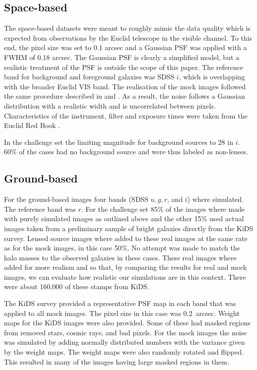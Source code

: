 \documentclass[useAMS,usenatbib]{mnras}
\begin{document}
\subsection{Space-based}
\label{sec:sim-space-based}

The space-based datasets were meant to roughly mimic the data quality which is expected from observations by the Euclid telescope in the visible channel. To this end, the pixel size was set to 0.1 arcsec and a Gaussian PSF was applied with a FWHM of 0.18 arcsec. The Gaussian PSF is clearly a simplified model, but a realistic treatment of the PSF is outside the scope of this paper. The reference band for background and foreground galaxies was SDSS $i$, which is overlapping with the broader Euclid VIS band. The realisation of the mock images followed the same procedure described in \citet{2004PASP..116..750G} and \citet{2008A&A...482..403M}. As a result, the noise follows a Gaussian distribution with a realistic width and is uncorrelated between pixels. Characteristics of the instrument, filter and exposure times were taken from the Euclid Red Book \citep{2011arXiv1110.3193L}.
 
 In the challenge set the limiting magnitude for background sources to 28 in $i$.   60\% of the cases had no background source and were thus labeled as non-lenses.
 
\subsection{Ground-based}
\label{sec:sim-ground-based}

For the ground-based images four bands (SDSS $u,g,r$, and $i$) where simulated.  The reference band was $r$.  For the challenge set 85\% of the images where made with purely simulated images as outlined above and the other 15\% used actual images taken from a preliminary sample of bright galaxies directly from the KiDS survey.  Lensed source images where added to these real images at the same rate as for the mock images,  in this case 50\%.  No attempt was made to match the halo masses to the observed galaxies in these cases.  These real images where added for more realism and so that, by comparing the results for real and mock images, we can evaluate how realistic our simulations are in this context.  There were about 160,000 of these stamps from KiDS.

The KiDS survey provided a representative PSF map in each band that was applied to all mock images.   The pixel size in this case was 0.2~arcsec. 
Weight maps for the KiDS images were also provided.  Some of these had masked regions from removed stars, cosmic rays, and bad pixels.  For the mock images the noise was simulated by adding normally distributed numbers with the variance given by the weight maps.  The weight maps were also randomly rotated and flipped.  This resulted in many of the images having large masked regions in them.
\end{document}
